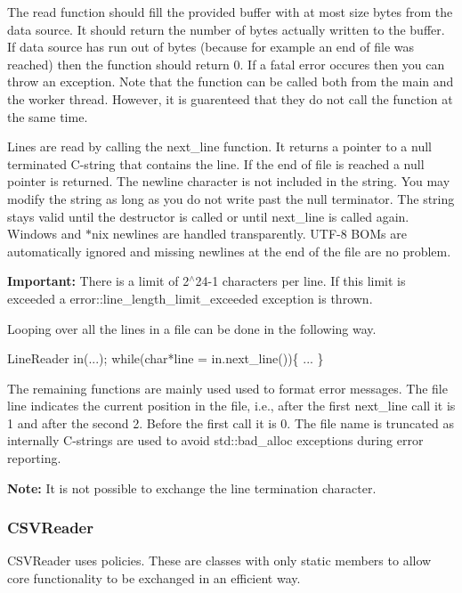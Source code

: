 The read function should fill the provided buffer with at most {\ttfamily size} bytes from the data source. It should return the number of bytes actually written to the buffer. If data source has run out of bytes (because for example an end of file was reached) then the function should return 0. If a fatal error occures then you can throw an exception. Note that the function can be called both from the main and the worker thread. However, it is guarenteed that they do not call the function at the same time.

Lines are read by calling the {\ttfamily next\+\_\+line} function. It returns a pointer to a null terminated C-\/string that contains the line. If the end of file is reached a null pointer is returned. The newline character is not included in the string. You may modify the string as long as you do not write past the null terminator. The string stays valid until the destructor is called or until next\+\_\+line is called again. Windows and {\ttfamily $\ast$}nix newlines are handled transparently. U\+T\+F-\/8 B\+O\+Ms are automatically ignored and missing newlines at the end of the file are no problem.

{\bfseries Important\+:} There is a limit of 2$^\wedge$24-\/1 characters per line. If this limit is exceeded a {\ttfamily error\+::line\+\_\+length\+\_\+limit\+\_\+exceeded} exception is thrown.

Looping over all the lines in a file can be done in the following way. 
\begin{DoxyCode}
LineReader in(...);
\textcolor{keywordflow}{while}(\textcolor{keywordtype}{char}*line = in.next\_line())\{
  ...
\}
\end{DoxyCode}


The remaining functions are mainly used used to format error messages. The file line indicates the current position in the file, i.\+e., after the first {\ttfamily next\+\_\+line} call it is 1 and after the second 2. Before the first call it is 0. The file name is truncated as internally C-\/strings are used to avoid {\ttfamily std\+::bad\+\_\+alloc} exceptions during error reporting.

{\bfseries Note\+:} It is not possible to exchange the line termination character.

\subsubsection*{{\ttfamily C\+S\+V\+Reader}}

{\ttfamily C\+S\+V\+Reader} uses policies. These are classes with only static members to allow core functionality to be exchanged in an efficient way.


